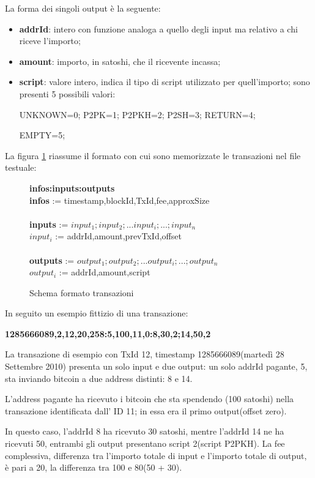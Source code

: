 La forma dei singoli output è la seguente:
\begin{itemize}
    \item \textbf{addrId}: intero con funzione analoga a quello degli input ma relativo a chi riceve l'importo; 
    \item \textbf{amount}: importo, in satoshi, che il ricevente incassa;
    \item \textbf{script}: valore intero, indica il tipo di script utilizzato per quell'importo; sono presenti 5 possibili valori: 
    
    UNKNOWN=0; P2PK=1; P2PKH=2; P2SH=3; RETURN=4;
    
    EMPTY=5;
\end{itemize}
La figura \ref{tx} riassume il formato con cui sono memorizzate le transazioni nel file testuale:
\begin{figure}[h]
\begin{mdframed}
\textbf{infos:inputs:outputs}\\
\textbf{infos} := timestamp,blockId,TxId,fee,approxSize\\\\
\textbf{inputs} := $input_1;input_2;...input_i;...;input_n$\\
$input_i$ := addrId,amount,prevTxId,offset\\\\
\textbf{outputs} := $output_1;output_2;...output_i;...;output_n$\\
$output_i$ := addrId,amount,script
\end{mdframed}
\caption{Schema formato transazioni}
\label{tx}
\end{figure}
\FloatBarrier
In seguito un esempio fittizio di una transazione:
\begin{center}
\textbf{1285666089,2,12,20,258:5,100,11,0:8,30,2;14,50,2}
\end{center}

La transazione di esempio con TxId 12, timestamp 1285666089(martedì 28 Settembre 2010) presenta un solo input e due output: un solo addrId pagante, 5, sta inviando bitcoin a due address distinti: 8 e 14.

L’address pagante
ha ricevuto i bitcoin che sta spendendo (100 satoshi) nella transazione identificata dall' ID 11; in essa era il primo output(offset zero). 

In questo caso, l’addrId 8 ha ricevuto 30 satoshi, mentre l’addrId 14 ne ha ricevuti 50, entrambi gli output presentano script 2(script P2PKH). La fee complessiva, differenza tra l'importo totale di input e l'importo totale di output, è pari a 20, la differenza tra 100 e 80(50 + 30).

